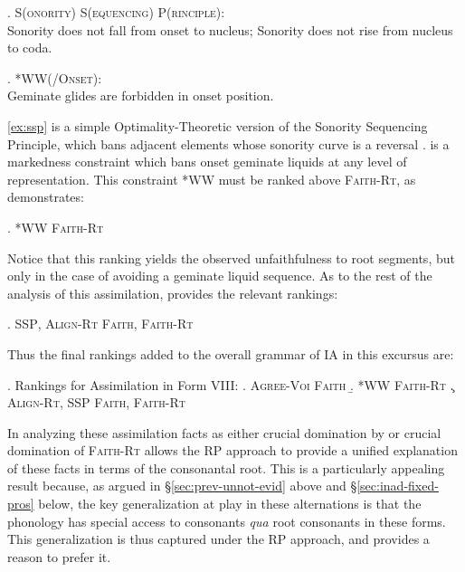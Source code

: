 \documentclass[12pt,twoside,letterpaper]{article}
\begin{document}
\ex. \label{ex:ssp}\textsc{S(onority) S(equencing) P(rinciple)}:\\Sonority does not fall from onset to nucleus; Sonority does not rise from nucleus to coda.

\ex. \label{ex:ww}\textsc{*WW(/Onset)}:\\Geminate glides are forbidden in onset position.

\ref{ex:ssp} is a simple Optimality-Theoretic version of the Sonority Sequencing Principle, which bans adjacent elements whose sonority curve is a reversal \citep{hankamer74}. \Last is a markedness constraint which bans onset geminate liquids at any level of representation. This constraint \textsc{*WW} must be ranked above \textsc{Faith-Rt}, as \Next demonstrates:

\pagebreak

\ex. \textsc{*WW} \OTdom \textsc{Faith-Rt}\\\begin{OTtableau}{2}
\end{OTtableau}

Notice that this ranking yields the observed unfaithfulness to root segments, but only in the case of avoiding a geminate liquid sequence. As to the rest of the analysis of this assimilation, \Next provides the relevant rankings:

\ex. \textsc{SSP}, \textsc{Align-Rt} \OTdom \textsc{Faith}, \textsc{Faith-Rt}\\\begin{OTtableau}{4}
\end{OTtableau}

Thus the final rankings added to the overall grammar of IA in this excursus are:

\ex. Rankings for Assimilation in Form VIII:
\a. \textsc{Agree-Voi} \OTdom \textsc{Faith}
\b. \textsc{*WW} \OTdom \textsc{Faith-Rt}
\c. \textsc{Align-Rt}, \textsc{SSP} \OTdom \textsc{Faith}, \textsc{Faith-Rt}

In analyzing these assimilation facts as either crucial domination by or crucial domination of \textsc{Faith-Rt} allows the RP approach to provide a unified explanation of these facts in terms of the consonantal root. This is a particularly appealing result because, as argued in \S{\ref{sec:prev-unnot-evid}} above and \S{\ref{sec:inad-fixed-pros}} below, the key generalization at play in these alternations is that the phonology has special access to consonants \emph{qua} root consonants in these forms. This generalization is thus captured under the RP approach, and provides a reason to prefer it.
\end{document}
